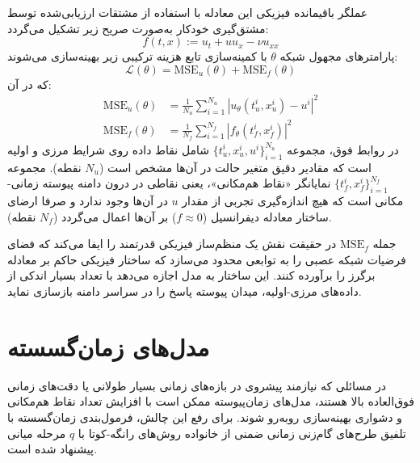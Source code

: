 عملگر باقیمانده فیزیکی این معادله با استفاده از مشتقات ارزیابی‌شده توسط مشتق‌گیری خودکار به‌صورت صریح زیر تشکیل می‌گردد:
\begin{equation}
f(t,x) := u_t + u u_x - \nu u_{xx}
\label{eq:burgers-f}
\end{equation}
پارامترهای مجهول شبکه $\theta$ با کمینه‌سازی تابع هزینه ترکیبی زیر بهینه‌سازی می‌شوند:
\begin{equation}
\mathcal{L}(\theta) = \mathrm{MSE}_u(\theta) + \mathrm{MSE}_f(\theta)
\label{eq:loss-forward}
\end{equation}
که در آن:
\begin{equation}
\begin{aligned}
\mathrm{MSE}_u(\theta) &= \frac{1}{N_u}\sum_{i=1}^{N_u} \left|u_\theta(t^i_u,x^i_u) - u^i\right|^2 \\
\mathrm{MSE}_f(\theta) &= \frac{1}{N_f}\sum_{i=1}^{N_f} \left|f_\theta(t^i_f,x^i_f)\right|^2
\end{aligned}
\label{eq:loss-terms}
\end{equation}
در روابط فوق، مجموعه $\{t^i_u, x^i_u, u^i\}_{i=1}^{N_u}$ شامل نقاط داده روی شرایط مرزی و اولیه است که مقادیر دقیق متغیر حالت در آن‌ها مشخص است ($N_u$ نقطه). مجموعه $\{t^i_f, x^i_f\}_{i=1}^{N_f}$ نمایانگر «نقاط هم‌مکانی»، یعنی نقاطی در درون دامنه پیوسته زمانی-مکانی است که هیچ اندازه‌گیری تجربی از مقدار $u$ در آن‌ها وجود ندارد و صرفا ارضای ساختار معادله دیفرانسیل ($f \approx 0$) بر آن‌ها اعمال می‌گردد ($N_f$ نقطه).

جمله $\mathrm{MSE}_f$ در حقیقت نقش یک منظم‌ساز فیزیکی قدرتمند را ایفا می‌کند که فضای فرضیات شبکه عصبی را به توابعی محدود می‌سازد که ساختار فیزیکی حاکم بر معادله برگرز را برآورده کنند. این ساختار به مدل اجازه می‌دهد با تعداد بسیار اندکی از داده‌های مرزی-اولیه، میدان پیوسته پاسخ را در سراسر دامنه بازسازی نماید.

\section{مدل‌های زمان‌گسسته}
\label{sec:discrete}

در مسائلی که نیازمند پیشروی در بازه‌های زمانی بسیار طولانی یا دقت‌های زمانی فوق‌العاده بالا هستند، مدل‌های زمان‌پیوسته ممکن است با افزایش تعداد نقاط هم‌مکانی و دشواری بهینه‌سازی روبه‌رو شوند. برای رفع این چالش، فرمول‌بندی زمان‌گسسته با تلفیق طرح‌های گام‌زنی زمانی ضمنی از خانواده روش‌های رانگه-کوتا با $q$ مرحله میانی پیشنهاد شده است.

